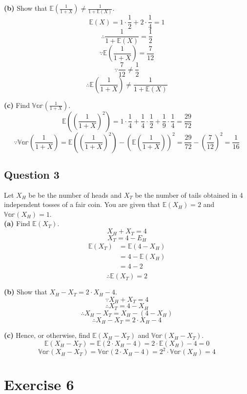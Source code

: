 \documentclass[
]{book}
\begin{document}
\textbf{(b)} Show that \(\mathbb{E}(\frac{1}{1+X}) \neq \frac{1}{1+\mathbb{E}(X)}\).\\
\[\mathbb{E}(X) = 1 \cdot \frac{1}{2} + 2 \cdot \frac{1}{4} = 1\]
\[\therefore \frac{1}{1+\mathbb{E}(X)} = \frac{1}{2}\]
\[\because \mathbb{E}(\frac{1}{1+X}) = \frac{7}{12}\]
\[\because \frac{7}{12} \neq \frac{1}{2}\]
\[\therefore \mathbb{E}(\frac{1}{1+X}) \neq \frac{1}{1+\mathbb{E}(X)}\]

\textbf{(c)} Find \(\mathbb{Var}(\frac{1}{1+X})\).\\
\[\mathbb{E}((\frac{1}{1+X})^2) = 1 \cdot \frac{1}{4} + \frac{1}{4} \cdot \frac{1}{2} + \frac{1}{9} \cdot \frac{1}{4} = \frac{29}{72}\]
\[\because \mathbb{Var}(\frac{1}{1+X}) = \mathbb{E}((\frac{1}{1+X})^2) - (\mathbb{E}(\frac{1}{1+X}))^2 = \frac{29}{72} - (\frac{7}{12})^2 = \frac{1}{16}\]

\section{Question 3}\label{question-3-3}

Let \(X_H\) be be the number of heads and \(X_T\) be the number of tails obtained in 4 independent tosses of a fair coin. You are given that \(\mathbb{E}(X_H) = 2\) and \(\mathbb{Var}(X_H) = 1\).\\
\textbf{(a)} Find \(\mathbb{E}(X_T)\).\\
\[X_H + X_T = 4\]
\[X_T = 4 - E_H\]
\[\begin{aligned}
\mathbb{E}(X_T) &= \mathbb{E}(4 - X_H) \\
                  &= 4 - \mathbb{E}(X_H) \\
                  &= 4 - 2 \\
\end{aligned}\]
\[\therefore \mathbb{E}(X_T) = 2\]

\textbf{(b)} Show that \(X_H - X_T = 2 \cdot X_H -4\).\\
\[\because X_H + X_T = 4\]
\[\therefore X_T = 4 - X_H\]
\[\therefore X_H - X_T = X_H - (4 - X_H)\]
\[\therefore X_H - X_T = 2 \cdot X_H - 4\]

\textbf{(c)} Hence, or otherwise, find \(\mathbb{E}(X_H - X_T)\) and \(\mathbb{Var}(X_H - X_T)\).\\
\[\mathbb{E}(X_H - X_T) = \mathbb{E}(2 \cdot X_H - 4) = 2 \cdot \mathbb{E}(X_H) -4 = 0\]
\[\mathbb{Var}(X_H - X_T) = \mathbb{Var}(2 \cdot X_H - 4) = 2^2 \cdot \mathbb{Var}(X_H) = 4\]

\chapter{Exercise 6}\label{exercise-6}
\end{document}
